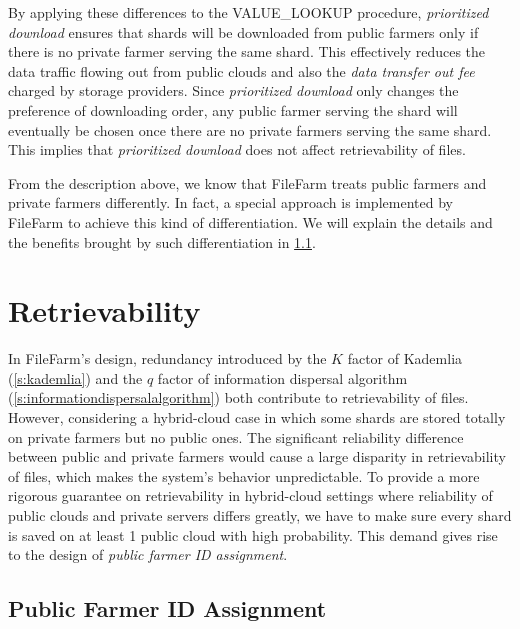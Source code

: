 By applying these differences to the VALUE\_LOOKUP procedure, \textit{prioritized download} ensures that shards will be downloaded from public farmers only if there is no private farmer serving the same shard. This effectively reduces the data traffic flowing out from public clouds and also the \textit{data transfer out fee} charged by storage providers. Since \textit{prioritized download} only changes the preference of downloading order, any public farmer serving the shard will eventually be chosen once there are no private farmers serving the same shard. This implies that \textit{prioritized download} does not affect retrievability of files.

From the description above, we know that FileFarm treats public farmers and private farmers differently. In fact, a special approach is implemented by FileFarm to achieve this kind of differentiation. We will explain the details and the benefits brought by such differentiation in \ref{ss:publicfarmeridassignment}.

\section{Retrievability}
\label{s:retrievability}

In FileFarm's design, redundancy introduced by the $K$ factor of Kademlia (\ref{s:kademlia}) and the $q$ factor of information dispersal algorithm (\ref{s:informationdispersalalgorithm}) both contribute to retrievability of files. However, considering a hybrid-cloud case in which some shards are stored totally on private farmers but no public ones. The significant reliability difference between public and private farmers would cause a large disparity in retrievability of files, which makes the system's behavior unpredictable. To provide a more rigorous guarantee on retrievability in hybrid-cloud settings where reliability of public clouds and private servers differs greatly, we have to make sure every shard is saved on at least 1 public cloud with high probability. This demand gives rise to the design of \textit{public farmer ID assignment}.

\subsection{Public Farmer ID Assignment}
\label{ss:publicfarmeridassignment}

